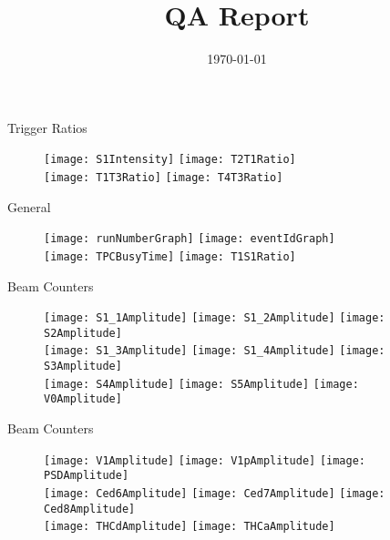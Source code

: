 \documentclass[11pt]{beamer}
\title[QA]{QA Report}
\date{\today}
\begin{document}
\begin{frame}
  \titlepage
\end{frame}

\begin{frame}{Trigger Ratios}
\begin{figure}
\centering
\texttt{[image: S1Intensity]}
\texttt{[image: T2T1Ratio]} \\
\texttt{[image: T1T3Ratio]}
\texttt{[image: T4T3Ratio]} \\
\end{figure}
\end{frame}

\begin{frame}{General}
\begin{figure}
\centering
\texttt{[image: runNumberGraph]}
\texttt{[image: eventIdGraph]} \\
\texttt{[image: TPCBusyTime]}
\texttt{[image: T1S1Ratio]} \\
\end{figure}
\end{frame}

\begin{frame}{Beam Counters}
\begin{figure}
\centering
\texttt{[image: S1\_1Amplitude]} 
\texttt{[image: S1\_2Amplitude]}
\texttt{[image: S2Amplitude]} \\
\texttt{[image: S1\_3Amplitude]}
\texttt{[image: S1\_4Amplitude]}
\texttt{[image: S3Amplitude]} \\
\texttt{[image: S4Amplitude]}
\texttt{[image: S5Amplitude]} 
\texttt{[image: V0Amplitude]} \\
\end{figure}
\end{frame}

\begin{frame}{Beam Counters}
\begin{figure}
\centering
\texttt{[image: V1Amplitude]} 
\texttt{[image: V1pAmplitude]}
\texttt{[image: PSDAmplitude]} \\
\texttt{[image: Ced6Amplitude]}
\texttt{[image: Ced7Amplitude]} 
\texttt{[image: Ced8Amplitude]} \\
\texttt{[image: THCdAmplitude]} 
\texttt{[image: THCaAmplitude]} 
\end{figure}
\end{frame}
\end{document}
